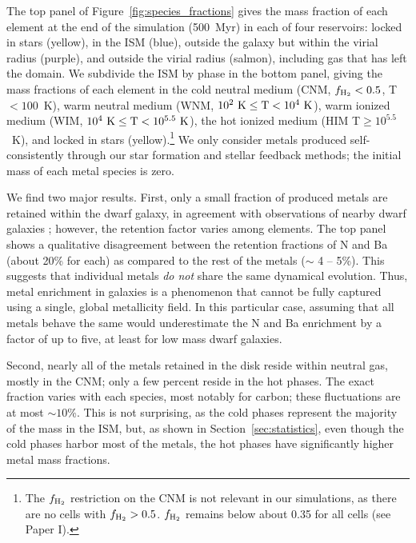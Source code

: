 The top panel of Figure~\ref{fig:species_fractions} gives the mass fraction of each element at the end of the simulation (500~Myr) in each of four reservoirs: locked in stars (yellow), in the ISM (blue), outside the galaxy but within the virial radius (purple), and outside the virial radius (salmon), including gas that has left the domain. We subdivide the ISM by phase in the bottom panel, giving the mass fractions of each element in the cold neutral medium (CNM, $f_{\rm H_2} < 0.5$,  T$< 100$~K), warm neutral medium (WNM, $10^2~\rm{K}\le \rm{T} < 10^4~\rm{K}$), warm ionized medium (WIM, $10^4~\rm{K}\le \rm{T} < 10^{5.5}~\rm{K}$), the hot ionized medium (HIM T$\ge 10^{5.5}$~K), and locked in stars (yellow).\footnote{The $f_{\rm H_2}$ restriction on the CNM is not relevant in our simulations, as there are no cells with $f_{\rm H_2} > 0.5$. $f_{\rm H_2}$ remains below about 0.35 for all cells (see Paper I).}
    We
only consider metals produced self-consistently through our star formation and stellar feedback methods; the initial mass of each metal species is zero.

We find two major results.
    First, 
only a small fraction of produced metals are retained within the dwarf galaxy, in agreement with observations of nearby dwarf galaxies \citep[see][]{Kirby2011-metals, McQuinn2015}; however, the retention factor varies 
    among elements. The top panel shows a qualitative disagreement between the retention fractions of N and Ba (about 20\% for each) as compared to the rest of the metals ($\sim$ 4 -- 5\%). This suggests that individual metals \textit{do not} share the same dynamical evolution. 
       Thus, 
metal enrichment in galaxies is a phenomenon that cannot be fully captured using a single, global metallicity field. In this particular case, assuming that all metals behave the same would underestimate the N and Ba enrichment by a factor of up to five, at least for low mass dwarf galaxies.

    Second,
nearly all of the metals 
    retained in the disk
reside within neutral gas, mostly in the CNM; only a few percent
reside in the hot phases. The exact fraction varies with each species, most notably for carbon; these fluctuations are at most $\sim 10$\%. This is not surprising, as the cold phases represent the majority of the mass in the ISM, but, as shown in Section~\ref{sec:statistics}, even though the cold phases harbor most of the metals, the hot phases have significantly higher metal mass fractions. 

